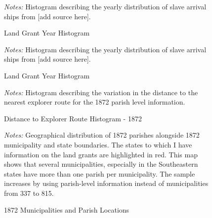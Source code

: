 \documentclass{article}
\begin{document}
\clearpage

\begin{figure}[h!]
  \caption{Land Grant Year Histogram}
  \begin{center}
  \end{center}
  \textit{Notes:} Histogram describing the yearly distribution of slave arrival ships from [add source here].  
  \label{fig:slave_distribution}
\end{figure}

\clearpage

\begin{figure}[h!]
  \caption{Land Grant Year Histogram}
  \begin{center}
  \end{center}
  \textit{Notes:} Histogram describing the yearly distribution of slave arrival ships from [add source here].  
  \label{fig:slave_distribution_region}
\end{figure}

\clearpage

\begin{figure}[h!]
  \caption{Distance to Explorer Route Histogram - 1872}
  \begin{center}
  \end{center}
  \textit{Notes:} Histogram describing the variation in the distance to the nearest explorer route for the 1872 parish level information.  
  \label{fig:1872_iv_hist}
\end{figure}


\clearpage

\begin{figure}[h!]
  \caption{1872 Municipalities and Parish Locations}
  \begin{center}
  \end{center}
  \textit{Notes:} Geographical distribution of 1872 parishes alongside 1872 municipality and state boundaries. The states to which I have information on the land grants are highlighted in red. This map shows that several municipalities, especially in the Southeastern states have more than one parish per municipality. The sample increases by using parish-level information instead of municipalities from 337 to 815.
  \label{fig:parishes_1872}
\end{figure}
\end{document}

